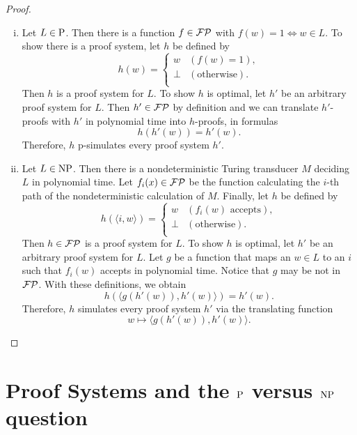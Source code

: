   \begin{proof}
    \begin{enumerate}[(i)]
      \item 
        Let \(L \in \P\). Then there is a function \(f \in \FP\) with \(f(w) = 1 \Leftrightarrow w \in L\). To show there is a proof system, let \(h\) be defined by
        \[
          h(w) =
          \begin{cases}
            w & (f(w) = 1), \\
            \perp & (\text{otherwise}). \\
          \end{cases}
        \]
        Then \(h\) is a proof system for \(L\). To show \(h\) is optimal, let \(h'\) be an arbitrary proof system for \(L\). Then \(h' \in \FP\) by definition and we can translate \(h'\)-proofs with \(h'\) in polynomial time into \(h\)-proofs, in formulas
        \[
          h(h'(w)) = h'(w).
        \]
        Therefore, \(h\) p-simulates every proof system \(h'\).
      \item
        Let \(L \in \NP\). Then there is a nondeterministic Turing transducer \(M\) deciding \(L\) in polynomial time. Let \(f_i(x) \in \FP\) be the function calculating the \(i\)-th path of the nondeterministic calculation of \(M\). Finally, let \(h\) be defined by
        \[
          h(\langle i, w \rangle) =
          \begin{cases}
            w & (f_i(w) \text{ accepts}), \\
            \perp & (\text{otherwise}). \\
          \end{cases}
        \]
        Then \(h \in \FP\) is a proof system for \(L\). To show \(h\) is optimal, let \(h'\) be an arbitrary proof system for \(L\). Let \(g\) be a function that maps an \(w \in L\) to an \(i\) such that \(f_i(w)\) accepts in polynomial time. Notice that \(g\) may be not in \(\FP\). With these definitions, we obtain
        \[
          h(\langle g(h'(w)), h'(w) \rangle) = h'(w).
        \]
        Therefore, \(h\) simulates every proof system \(h'\) via the translating function
          \[w \mapsto \langle g(h'(w)), h'(w) \rangle.\]
    \end{enumerate}
  \end{proof}
  
  \section{Proof Systems and the $\P$ versus $\NP$ question}  


